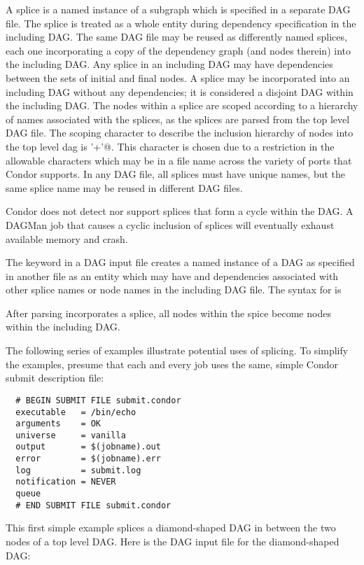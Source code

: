 A splice is a named instance of a subgraph which is specified in a
separate DAG file.
The splice is treated as a whole entity during dependency
specification in the including DAG.
The same DAG file may be reused as differently named splices,
each one
incorporating a copy of the dependency graph (and nodes therein) into the
including DAG. 
Any splice in an including DAG may have dependencies
between the sets of initial and final nodes.
A splice may be incorporated into an including DAG without any
dependencies; it is considered
a disjoint DAG within the including DAG.
The nodes within a splice are scoped according to
a hierarchy of names associated with the splices,
as the splices are parsed from the top level DAG file.
The scoping character to describe the
inclusion hierarchy of nodes into the top level dag is 
\verb@'+'@.
This character is chosen due
to a restriction in the allowable characters which may be in a file name
across the variety of ports that Condor supports.
In any DAG file, all splices must have unique names,
but the same splice name may be reused in different DAG files.

Condor does not detect nor support splices that form a cycle
within the DAG.
A DAGMan job that causes a cyclic inclusion of splices will
eventually exhaust available memory and crash.

The  keyword in a DAG input file
creates a named instance of a DAG as specified
in another file as an entity which may have  and 
dependencies associated with other splice names or node names in the
including DAG file.
The syntax for  is

   

After parsing incorporates a splice,
all nodes within the spice become nodes within the including DAG.


The following series of examples illustrate potential uses of
splicing. To simplify the examples,
presume that each and every job uses the same,
simple Condor submit description file:

\begin{verbatim}
  # BEGIN SUBMIT FILE submit.condor
  executable   = /bin/echo
  arguments    = OK
  universe     = vanilla
  output       = $(jobname).out
  error        = $(jobname).err
  log          = submit.log
  notification = NEVER
  queue
  # END SUBMIT FILE submit.condor
\end{verbatim}

This first simple example splices a diamond-shaped DAG in
between the two nodes of a top level DAG.
Here is the DAG input file for the diamond-shaped DAG:

